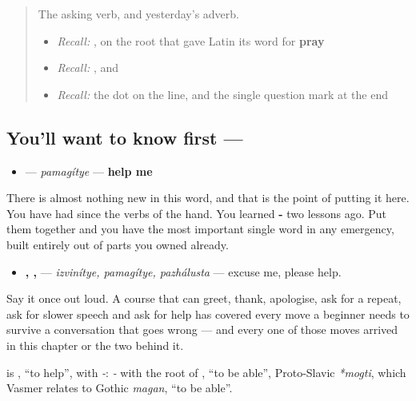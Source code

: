 \label{lesson:RU-C21-pomogite}



\begin{quote}
The asking verb, and yesterday's adverb.

\begin{itemize}
\raggedright
  \item \emph{Recall:} \emph{}, on the root that gave Latin its word for \textbf{pray}
  \item \emph{Recall:} \emph{ }, and \emph{}
  \item \emph{Recall:} the dot on the line, and the single question mark at the end
\end{itemize}
\end{quote}

\subsection*{You'll want to know first — }
\begin{itemize}
\raggedright
  \item \textbf{} — \emph{pamagítye} — \textbf{help me}
\end{itemize}

There is almost nothing new in this word, and that is the point of putting it here. You have had \textbf{} since the verbs of the hand. You learned \textbf{-} two lessons ago. Put them together and you have the most important single word in any emergency, built entirely out of parts you owned already.

\begin{itemize}
\raggedright
  \item \textbf{, , } — \emph{izvinítye, pamagítye, pazhálusta} — excuse me, please help.
\end{itemize}

Say it once out loud. A course that can greet, thank, apologise, ask for a repeat, ask for slower speech and ask for help has covered every move a beginner needs to survive a conversation that goes wrong — and every one of those moves arrived in this chapter or the two behind it.

\begin{cousinweb}
\textbf{} is \emph{}, \textquotedblleft{}to help\textquotedblright{}, with \emph{-}: \emph{-} with the root of \emph{}, \textquotedblleft{}to be able\textquotedblright{}, Proto-Slavic \emph{*mogti}, which Vasmer relates to Gothic \emph{magan}, \textquotedblleft{}to be able\textquotedblright{}.
\end{cousinweb}

